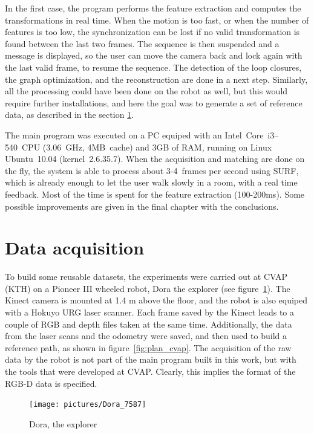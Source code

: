 In the first case, the program performs the feature extraction and computes the transformations in real time. When the motion is too fast, or when the number of features is too low, the synchronization can be lost if no valid transformation is found between the last two frames. The sequence is then suspended and a message is displayed, so the user can move the camera back and lock again with the last valid frame, to resume the sequence. The detection of the loop closures, the graph optimization, and the reconstruction are done in a next step. Similarly, all the processing could have been done on the robot as well, but this would require further installations, and here the goal was to generate a set of reference data, as described in the section \ref{sec:data_acquisition}.

The main program was executed on a PC equiped with an Intel~Core\texttrademark{}~\hbox{i3--540}~CPU (3.06~GHz, 4MB~cache) and 3GB of RAM, running on Linux Ubuntu~10.04 (kernel~2.6.35.7). When the acquisition and matching are done on the fly, the system is able to process about 3-4~frames per second using \gls{SURF}, which is already enough to let the user walk slowly in a room, with a real time feedback. Most of the time is spent for the feature extraction (100-200ms). Some possible improvements are given in the final chapter with the conclusions.

\clearpage
\section{Data acquisition}
\label{sec:data_acquisition}

To build some reusable datasets, the experiments were carried out at \gls{CVAP} (KTH) on a Pioneer III wheeled robot, Dora the explorer (see figure~\ref{fig:dora}). The Kinect camera is mounted at 1.4 m above the floor, and the robot is also equiped with a Hokuyo URG laser scanner. Each frame saved by the Kinect leads to a couple of RGB and depth files taken at the same time. Additionally, the data from the laser scans and the odometry were saved, and then used to build a reference path, as shown in figure~\ref{fig:plan_cvap}. The acquisition of the raw data by the robot is not part of the main program built in this work, but with the tools that were developed at \gls{CVAP}. Clearly, this implies the format of the RGB-D data is specified.

\begin{figure}[h]
 \begin{center}
 \texttt{[image: pictures/Dora\_7587]}
 \end{center}
\caption{Dora, the explorer}
\label{fig:dora}
\end{figure}

